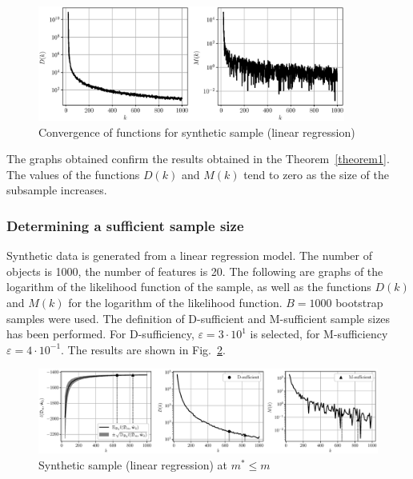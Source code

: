 \documentclass[
11pt,%
tightenlines,%
twoside,%
onecolumn,%
nofloats,%
nobibnotes,%
nofootinbib,%
superscriptaddress,%
noshowpacs,%
centertags]%
{revtex4-2}
\begin{document}
\begin{figure}[h!]
    \centering
    \includegraphics[width=0.9\textwidth]{../paper/figures/gray/eps/synthetic-regression-functions-D-M}
    \caption{Convergence of functions for synthetic sample (linear regression)}
    \label{synthetic-regression-functions}
\end{figure}

The graphs obtained confirm the results obtained in the Theorem~\ref{theorem1}. The values of the functions $D(k)$ and $M(k)$ tend to zero as the size of the subsample increases. 

\subsubsection{Determining a sufficient sample size}

Synthetic data is generated from a linear regression model. The number of objects is 1000, the number of features is 20. The following are graphs of the logarithm of the likelihood function of the sample, as well as the functions $D(k)$ and $M(k)$ for the logarithm of the likelihood function. $B=1000$ bootstrap samples were used. The definition of D-sufficient and M-sufficient sample sizes has been performed. For D-sufficiency, $\varepsilon = 3 \cdot 10^{1}$ is selected, for M-sufficiency $\varepsilon = 4 \cdot 10^{-1}$. The results are shown in Fig.~\ref{synthetic-regression-sufficient}. 

\begin{figure}[h!]
    \centering
    \includegraphics[width=\textwidth]{../paper/figures/gray/eps/synthetic-regression-sufficient}
    \caption{Synthetic sample (linear regression) at $m^*\leqslant m$}
    \label{synthetic-regression-sufficient}
\end{figure}
\end{document}

